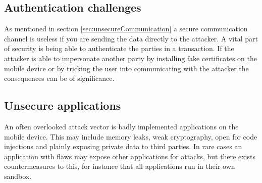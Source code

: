 \subsection{Authentication challenges}
\label{sec:authenticationChallenges}
As mentioned in section \ref{sec:unsecureCommunication} a secure communication channel is useless if you are sending the data directly to the attacker. A vital part of security is being able to authenticate the parties in a transaction. If the attacker is able to impersonate another party by installing fake certificates on the mobile device or by tricking the user into communicating with the attacker the consequences can be of significance.

\subsection{Unsecure applications}
An often overlooked attack vector is badly implemented applications on the mobile device. This may include memory leaks, weak cryptography, open for code injections and plainly exposing private data to third parties. In rare cases an application with flaws may expose other applications for attacks, but there exists countermeasures to this, for instance that all applications run in their own sandbox.
